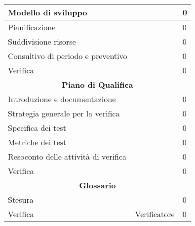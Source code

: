 \begin{table}[]
\begin{tabular}{|l|l|l|}
Modello di sviluppo & & 0 \\ \hline
Pianificazione & & 0 \\ \hline
Suddivisione risorse & & 0 \\ \hline
Consultivo di periodo e preventivo  & & 0 \\ \hline
Verifica & & 0 \\ \hline
\multicolumn{3}{|c|}{\textbf{Piano di Qualifica}} \\ \hline
Introduzione e documentazione & & 0 \\ \hline
Strategia generale per la verifica  & & 0 \\ \hline
Specifica dei test & & 0 \\ \hline
Metriche dei test & & 0 \\ \hline
Resoconto delle attività di verifica & & 0 \\ \hline
Verifica & & 0 \\ \hline
\multicolumn{3}{|c|}{\textbf{Glossario}} \\ \hline
Stesura & & 0 \\ \hline
Verifica & Verificatore & 0 \\ \hline
\end{tabular}
\end{table}

\pagebreak
